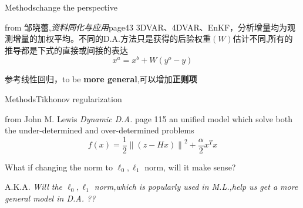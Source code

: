 \documentclass{beamer}
\begin{document}
\begin{frame}{Methods}{\quad \quad \quad change the perspective}

\begin{block}{from 邹晓蕾,\emph{资料同化与应用}page43}
3DVAR、4DVAR、EnKF，分析增量均为观测增量的加权平均。不同的D.A.方法只是获得的后验权重$(W)$估计不同,所有的推导都是下式的直接或间接的表达
\begin{equation}
x^{a}=x^b+W(y^o-y)
\end{equation}
\end{block}
参考线性回归，to be \textbf{more general},可以增加\textbf{正则项}
%

\end{frame}

\begin{frame}{Methods}{\quad \quad \quad Tikhonov regularization}

\begin{block}{from John M. Lewis \emph{Dynamic D.A.} page 115}
an unified model which solve both the under-determined and over-determined problems
\begin{equation}
f(x)=\frac{1}{2}\left \| (z-Hx) \right \|^2+\frac{\alpha}{2}x^Tx
\end{equation}

\end{block}
What if changing the norm to $\ell_0,\ell_1$ norm, will it make sense?

A.K.A. \emph{Will the $\ell_0,\ell_1$ norm,which is popularly used in M.L.,help us get a more general model in D.A. ?? }
\end{frame}

\end{document}
